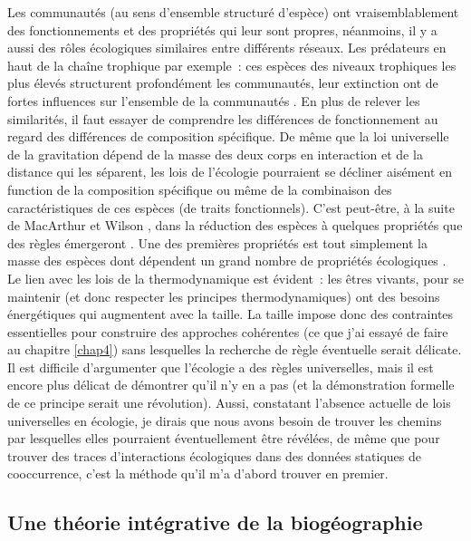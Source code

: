 Les communautés (au sens d'ensemble structuré d'espèce) ont
vraisemblablement des fonctionnements et des propriétés qui leur sont
propres, néanmoins, il y a aussi des rôles écologiques similaires entre
différents réseaux. Les prédateurs en haut de la chaîne trophique par
exemple~: ces espèces des niveaux trophiques les plus élevés structurent
profondément les communautés, leur extinction ont de fortes influences
sur l'ensemble de la communautés
\citep{Terborgh2001, Sinclair2003a, Myers2007, Ripple2014}. En plus de
relever les similarités, il faut essayer de comprendre les différences
de fonctionnement au regard des différences de composition spécifique.
De même que la loi universelle de la gravitation dépend de la masse des
deux corps en interaction et de la distance qui les séparent, les lois
de l'écologie pourraient se décliner aisément en function de la
composition spécifique ou même de la combinaison des caractéristiques de
ces espèces (de traits fonctionnels). C'est peut-être, à la suite de
MacArthur et Wilson \citep{MacArthur1967}, dans la réduction des espèces
à quelques propriétés que des règles émergeront
\citep{McGill2006, Poisot2015}. Une des premières propriétés est tout
simplement la masse des espèces dont dépendent un grand nombre de
propriétés écologiques \citep{Woodward2005a}. Le lien avec les lois de
la thermodynamique est évident~: les êtres vivants, pour se maintenir
(et donc respecter les principes thermodynamiques) ont des besoins
énergétiques qui augmentent avec la taille. La taille impose donc des
contraintes essentielles pour construire des approches cohérentes (ce
que j'ai essayé de faire au chapitre \ref{chap4}) sans lesquelles la
recherche de règle éventuelle serait délicate. Il est difficile
d'argumenter que l'écologie a des règles universelles, mais il est
encore plus délicat de démontrer qu'il n'y en a pas (et la démonstration
formelle de ce principe serait une révolution). Aussi, constatant
l'absence actuelle de lois universelles en écologie, je dirais que nous
avons besoin de trouver les chemins par lesquelles elles pourraient
éventuellement être révélées, de même que pour trouver des traces
d'interactions écologiques dans des données statiques de cooccurrence,
c'est la méthode qu'il m'a d'abord trouver en premier.

\subsection*{Une théorie intégrative de la
biogéographie}\label{une-thuxe9orie-intuxe9grative-de-la-bioguxe9ographie}

